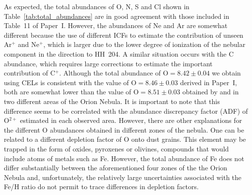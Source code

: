 \documentclass[twocolumn,linenumbers]{aastex63}
\newcommand{\cesar}[1]{{\color{red}C: #1}}
\begin{document}
As expected, the total abundances of O, N, S and Cl shown in Table~\ref{tab:total_abundances} are in good agreement with those included in Table~11 of Paper~I. However, the abundances of Ne and Ar are somewhat different because the use of different ICFs to estimate the contribution of unseen Ar$^{+}$ and Ne$^{+}$, which is larger due to the lower degree of ionization of the nebular component in the direction to HH~204. A similar situation occurs with the C abundance, which requires large corrections to estimate the important contribution of C$^+$. Although the total abundance of $\text{O}=8.42 \pm 0.04$ we obtain using CELs is consistent with the value of  $\text{O}=8.46 \pm 0.03$ derived in Paper~I, both are somewhat lower than the value of $\text{O}=8.51 \pm 0.03$ obtained by \citet{Esteban04} and \citet{mesadelgado09} in two different areas of the Orion Nebula. It is important to note that this difference seems to be correlated with the abundance discrepancy factor (ADF) of O$^{2+}$ estimated in each observed area. 
However, there are other explanations for the different O abundances obtained in different zones of the nebula. One can be related to a different depletion factor of O onto dust grains. This element may be trapped in the form of oxides, pyroxenes or olivines, compounds that would include atoms of metals such as Fe. However, the total abundance of Fe does not differ substantially between the aforementioned four zones of the the Orion Nebula and, unfortunately, the relatively large uncertainties associated with the Fe/H ratio do not permit to trace differences in depletion factors. %
\end{document}
